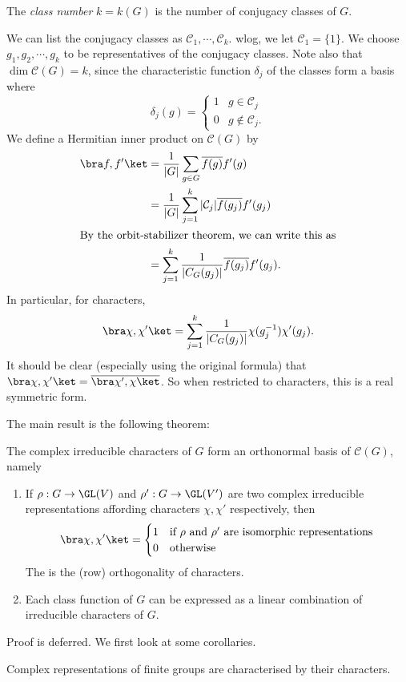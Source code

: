 \documentclass[a4paper]{article}
\begin{document}
\begin{defi}
  The \emph{class number} $k = k(G)$ is the number of conjugacy classes of $G$.
\end{defi}
We can list the conjugacy classes as $\mathcal{C}_1, \cdots, \mathcal{C}_k$. wlog, we let $\mathcal{C}_1 = \{1\}$. We choose $g_1, g_2, \cdots, g_k$ to be representatives of the conjugacy classes. Note also that $\dim \mathcal{C}(G) = k$, since the characteristic function $\delta_j$ of the classes form a basis where
\[
  \delta_j(g) =
  \begin{cases}
    1 & g \in \mathcal{C}_j\\
    0 & g \not\in \mathcal{C}_j.
  \end{cases}
\]
We define a Hermitian inner product on $\mathcal{C}(G)$ by
\begin{align*}
  \bra f, f'\ket &= \frac{1}{|G|} \sum_{g \in G}\overline{f(g)} f'(g) \\
  &= \frac{1}{|G|} \sum_{j = 1}^k |\mathcal{C}_j|\overline{f(g_j)} f'(g_j)\\
  \intertext{By the orbit-stabilizer theorem, we can write this as}
  &= \sum_{j = 1}^k \frac{1}{|C_G(g_j)|} \overline{f(g_j)} f'(g_j).
\end{align*}
In particular, for characters,
\[
  \bra \chi, \chi'\ket = \sum_{j = 1}^k \frac{1}{|C_G(g_j)|} \chi(g_j^{-1}) \chi'(g_j).
\]
It should be clear (especially using the original formula) that $\bra \chi, \chi'\ket = \overline{\bra \chi', \chi\ket}$. So when restricted to characters, this is a real symmetric form.

The main result is the following theorem:
\begin{thm}
  The complex irreducible characters of $G$ form an orthonormal basis of $\mathcal{C}(G)$, namely
  \begin{enumerate}
    \item If $\rho: G \to \GL(V)$ and $\rho': G \to \GL(V')$ are two complex irreducible representations affording characters $\chi, \chi'$ respectively, then
      \[
        \bra \chi, \chi'\ket =
        \begin{cases}
          1 & \text{if $\rho$ and $\rho'$ are isomorphic representations}\\
          0 & \text{otherwise}
        \end{cases}
      \]
      The is the (row) orthogonality of characters.
    \item Each class function of $G$ can be expressed as a linear combination of irreducible characters of $G$.
  \end{enumerate}
\end{thm}
Proof is deferred. We first look at some corollaries.
\begin{cor}
  Complex representations of finite groups are characterised by their characters.
\end{cor}
\end{document}
